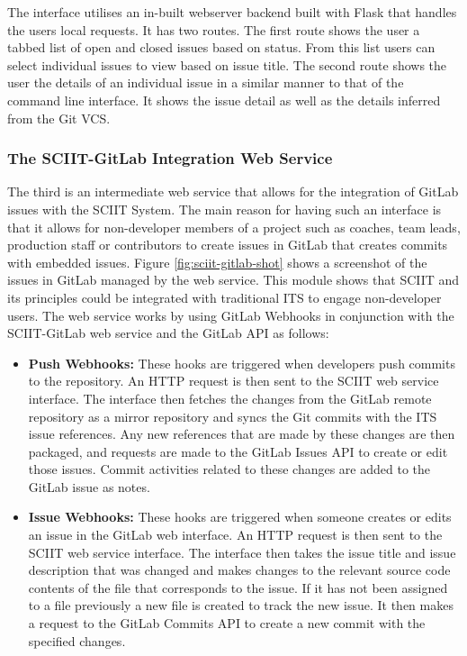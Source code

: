\documentclass{mproj}
\begin{document}
The interface utilises an in-built webserver backend built with Flask that handles the users local requests. It has two routes. The first route shows the user a tabbed list of open and closed issues based on status. From this list users can select individual issues to view based on issue title. The second route shows the user the details of an individual issue in a similar manner to that of the command line interface. It shows the issue detail as well as the details inferred from the Git VCS.

\subsubsection{The SCIIT-GitLab Integration Web Service}

The third is an intermediate web service that allows for the integration of GitLab issues with the SCIIT System. The main reason for having such an interface is that it allows for non-developer members of a project such as coaches, team leads, production staff or contributors to create issues in GitLab that creates commits with embedded issues. Figure \ref{fig:sciit-gitlab-shot} shows a screenshot of the issues in GitLab managed by the web service. This module shows that SCIIT and its principles could be integrated with traditional ITS to engage non-developer users. The web service works by using GitLab Webhooks in conjunction with the SCIIT-GitLab web service and the GitLab API as follows:

\begin{itemize}
  \item \textbf{Push Webhooks:} These hooks are triggered when developers push commits to the repository. An HTTP request is then sent to the SCIIT web service interface. The interface then fetches the changes from the GitLab remote repository as a mirror repository and syncs the Git commits with the ITS issue references. Any new references that are made by these changes are then packaged, and requests are made to the GitLab Issues API to create or edit those issues. Commit activities related to these changes are added to the GitLab issue as notes.
  \item \textbf{Issue Webhooks:} These hooks are triggered when someone creates or edits an issue in the GitLab web interface. An HTTP request is then sent to the SCIIT web service interface. The interface then takes the issue title and issue description that was changed and makes changes to the relevant source code contents of the file that corresponds to the issue. If it has not been assigned to a file previously a new file is created to track the new issue. It then makes a request to the GitLab Commits API to create a new commit with the specified changes.
\end{itemize}
\end{document}
